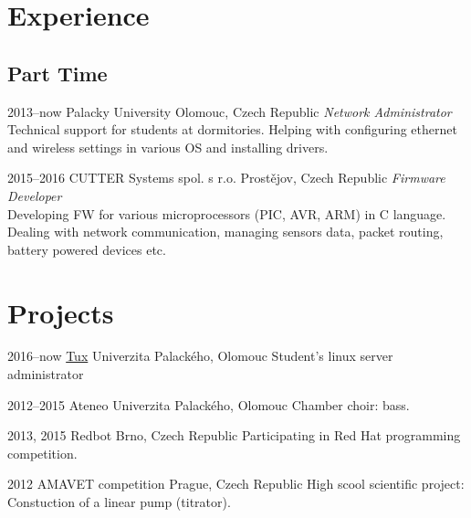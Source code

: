 \documentclass[]{friggeri-cv} %
\begin{document}

\section{Experience}

\subsection{Part Time}
\begin{entrylist}

\entry
{2013--now}
{Palacky University}
{Olomouc, Czech Republic}
{\emph{Network Administrator} \\
Technical support for students at dormitories. Helping with configuring ethernet and wireless settings in various OS and installing drivers.}

\entry
{2015--2016}
{CUTTER Systems spol. s r.o.}
{Prostějov, Czech Republic}
{\emph{Firmware Developer} \\
Developing FW for various microprocessors (PIC, AVR, ARM) in C language. Dealing with network communication, managing sensors data, packet routing, battery powered devices etc.}

\end{entrylist}

\section{Projects}

\begin{entrylist}
\entry
{2016--now}
{\href{https://tux.inf.upol.cz}{Tux}}
{Univerzita Palackého, Olomouc}
{Student's linux server administrator}

\entry
{2012--2015}
{Ateneo}
{Univerzita Palackého, Olomouc}
{Chamber choir: bass.}

\entry
{2013, 2015}
{Redbot}
{Brno, Czech Republic}
{Participating in Red Hat programming competition.}

\entry
{2012}
{AMAVET competition}
{Prague, Czech Republic}
{High scool scientific project: Constuction of a linear pump (titrator).}

\end{entrylist}
\end{document}
